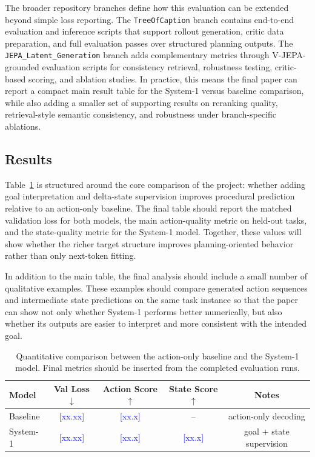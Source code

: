 \documentclass[11pt]{article}
\newcommand{\fillme}[1]{\textcolor{blue}{[#1]}}
\begin{document}
The broader repository branches define how this evaluation can be extended beyond simple loss reporting. The \texttt{TreeOfCaption} branch contains end-to-end evaluation and inference scripts that support rollout generation, critic data preparation, and full evaluation passes over structured planning outputs. The \texttt{JEPA\_Latent\_Generation} branch adds complementary metrics through V-JEPA-grounded evaluation scripts for consistency retrieval, robustness testing, critic-based scoring, and ablation studies. In practice, this means the final paper can report a compact main result table for the System-1 versus baseline comparison, while also adding a smaller set of supporting results on reranking quality, retrieval-style semantic consistency, and robustness under branch-specific ablations.

\subsection{Results}
Table~\ref{tab:results} is structured around the core comparison of the project: whether adding goal interpretation and delta-state supervision improves procedural prediction relative to an action-only baseline. The final table should report the matched validation loss for both models, the main action-quality metric on held-out tasks, and the state-quality metric for the System-1 model. Together, these values will show whether the richer target structure improves planning-oriented behavior rather than only next-token fitting.

In addition to the main table, the final analysis should include a small number of qualitative examples. These examples should compare generated action sequences and intermediate state predictions on the same task instance so that the paper can show not only whether System-1 performs better numerically, but also whether its outputs are easier to interpret and more consistent with the intended goal.

\begin{table}[t]
\centering
\caption{Quantitative comparison between the action-only baseline and the System-1 model. Final metrics should be inserted from the completed evaluation runs.}
\label{tab:results}
\begin{tabular}{lcccc}
\toprule
Model & Val Loss $\downarrow$ & Action Score $\uparrow$ & State Score $\uparrow$ & Notes \\
\midrule
Baseline & \fillme{xx.xx} & \fillme{xx.x} & -- & action-only decoding \\
System-1 & \fillme{xx.xx} & \fillme{xx.x} & \fillme{xx.x} & goal + state supervision \\
\bottomrule
\end{tabular}
\end{table}
\end{document}
